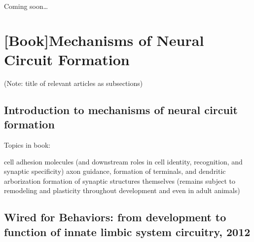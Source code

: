 \documentclass[11pt, a4paper, oneside]{article}   	%
\begin{document}
Coming soon\ldots

\section{\textbf{[Book]}Mechanisms of Neural Circuit Formation \cite{Weiner2015}}
(Note: title of relevant articles as subsections)

\subsection{Introduction to mechanisms of neural circuit formation}
Topics in book:
\begin{outline}
\point cell adhesion molecules (and downstream roles in cell identity, recognition, and synaptic specificity)
\point axon guidance, formation of terminals, and dendritic arborization
\point formation of synaptic structures themselves (remains subject to remodeling and plasticity throughout development and even in adult animals)
\end{outline}

\subsection{Wired for Behaviors: from development to function of innate limbic system circuitry, 2012}
\label{MNCF:wiredforbehaviors}
\end{document}
